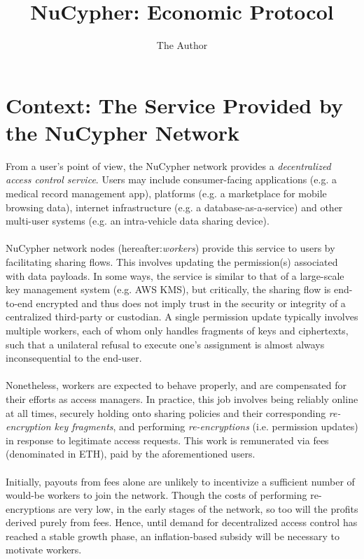 \documentclass[11pt]{amsart}
\title{NuCypher: Economic Protocol}
\author{The Author}
\begin{document}
\pagecolor{magicmint!30}
\maketitle

\section{Context: The Service Provided by the NuCypher Network}

From a user's point of view, the NuCypher network provides a {\it decentralized access control service}. Users may include consumer-facing applications (e.g. a medical record management app), platforms (e.g. a marketplace for mobile browsing data), internet infrastructure (e.g. a database-as-a-service) and other multi-user systems (e.g. an intra-vehicle data sharing device). 
\\
\\
NuCypher network nodes (hereafter:{\it workers}) provide this service to users by facilitating sharing flows. This involves updating the permission(s) associated with data payloads. In some ways, the service is similar to that of a large-scale key management system (e.g. AWS KMS), but critically, the sharing flow is end-to-end encrypted and thus does not imply trust in the security or integrity of a centralized third-party or custodian. A single permission update typically involves multiple workers, each of whom only handles fragments of keys and ciphertexts, such that a unilateral refusal to execute one's assignment is almost always inconsequential to the end-user. 
\\
\\
Nonetheless, workers are expected to behave properly, and are compensated for their efforts as access managers. In practice, this job involves being reliably online at all times, securely holding onto sharing policies and their corresponding {\it re-encryption key fragments}, and performing {\it re-encryptions} (i.e. permission updates) in response to legitimate access requests. This work is remunerated via fees (denominated in ETH), paid by the aforementioned users. 
\\
\\
Initially, payouts from fees alone are unlikely to incentivize a sufficient number of would-be workers to join the network. Though the costs of performing re-encryptions are very low, in the early stages of the network, so too will the profits derived purely from fees. Hence, until demand for decentralized access control has reached a stable growth phase, an inflation-based subsidy will be necessary to motivate workers. 
\end{document}

